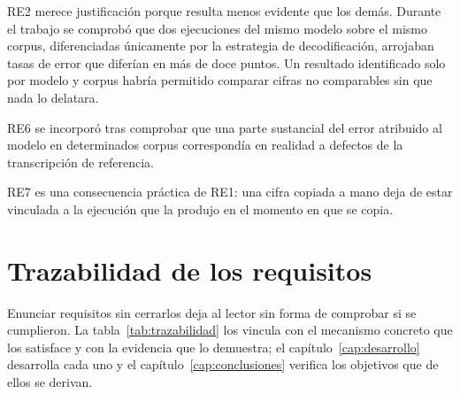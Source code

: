 RE2 merece justificación porque resulta menos evidente que los demás. Durante el trabajo se
comprobó que dos ejecuciones del mismo modelo sobre el mismo corpus, diferenciadas
únicamente por la estrategia de decodificación, arrojaban tasas de error que diferían en
más de doce puntos. Un resultado identificado solo por modelo y corpus habría permitido
comparar cifras no comparables sin que nada lo delatara.

RE6 se incorporó tras comprobar que una parte sustancial del error atribuido al modelo en
determinados corpus correspondía en realidad a defectos de la transcripción de referencia.

RE7 es una consecuencia práctica de RE1: una cifra copiada a mano deja de estar vinculada a
la ejecución que la produjo en el momento en que se copia.

\section{Trazabilidad de los requisitos}
\label{sec:trazabilidad-requisitos}

Enunciar requisitos sin cerrarlos deja al lector sin forma de comprobar si se cumplieron.
La tabla~\ref{tab:trazabilidad} los vincula con el mecanismo concreto que los satisface y
con la evidencia que lo demuestra; el capítulo~\ref{cap:desarrollo} desarrolla cada uno y el
capítulo~\ref{cap:conclusiones} verifica los objetivos que de ellos se derivan.

